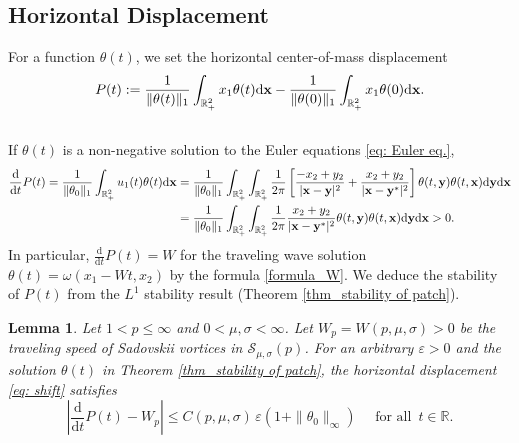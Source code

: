 \documentclass[11pt]{amsart}
\newtheorem{lemma}[theorem]{Lemma}
\theoremstyle{definition}
\theoremstyle{definition}
\numberwithin{equation}{section}
\newcommand{\0}{\emptyset}
\newcommand{\tht}{\theta}
\newcommand{\bfx}{{\bf x}}
\newcommand{\bfy}{{\bf y}}
\newcommand{\bbR}{\mathbb R}
\newcommand{\dd}{\mathrm{d}}
\begin{document}
			
			
			\subsection{Horizontal Displacement}
			
			For a function $\theta(t)$, we set the horizontal center-of-mass  displacement
			\begin{equation}
				P(t) := \frac{1}{ \| \theta(t) \|_1  }\int_{\bbR^2_+}x_1\tht(t)\dd\bfx-\frac{1}{ \| \theta(0) \|_1  }\int_{\bbR^2_+}x_1\tht(0)\dd\bfx.   \label{eq: shift}
			\end{equation}\\
			If $\theta(t)$ is a non-negative solution to the Euler equations \eqref{eq: Euler eq.}, 
			\begin{align*}
				\frac{\dd }{\dd t} P(t) =\frac{1}{ \| \theta_0 \|_1}\int_{\bbR^2_+}u_1(t)\tht(t)\dd\bfx
				&=\frac{1}{ \| \theta_0 \|_1}\int_{\bbR^2_+}\int_{\bbR^2_+}\frac{1}{2\pi}\left[\frac{-x_2+y_2}{|\bfx-\bfy|^2}+\frac{x_2+y_2}{|\bfx-\bfy^*|^2}\right]\tht(t,\bfy)\tht(t,\bfx)\dd\bfy\dd\bfx\\
				&=\frac{1}{ \| \theta_0 \|_1 }\int_{\bbR^2_+}\int_{\bbR^2_+}\frac{1}{2\pi}\frac{x_2+y_2}{|\bfx-\bfy^*|^2} \tht(t,\bfy)\tht(t,\bfx) \dd\bfy\dd\bfx>0. 
			\end{align*}
			In particular, $\frac{\dd }{\dd t} P(t) =W$ for the traveling wave solution $\theta(t)=\omega(x_1-Wt,x_2)$ by the formula \eqref{formula_W}. We deduce the stability of $P(t)$ from the $L^{1}$ stability result (Theorem \ref{thm_stability of patch}).
			
			
			\begin{lemma}\label{lem_shift estimate}
				Let $1<p\leq \infty$ and $0 < \mu, \sigma < \infty$.
				Let $W_p = W(p, \mu, \sigma)>0$ be the traveling speed of Sadovskii vortices in $\mathcal{S}_{\mu, \sigma}(p)$.
				For an arbitrary $\varepsilon>0$ and the solution $\theta(t)$ in Theorem \ref{thm_stability of patch}, the horizontal displacement \eqref{eq: shift} satisfies 
				\begin{equation}\label{tech eq: shift estimate} 
					\left| \frac{\dd }{\dd t} P(t) -W_p  \right|\le C(p, \mu, \sigma) \,  \varepsilon (1 + \|\theta_0\|_{\infty}) \quad \mbox{ for all }\, t\in\bbR.
				\end{equation}
			\end{lemma}
			
\end{document}
